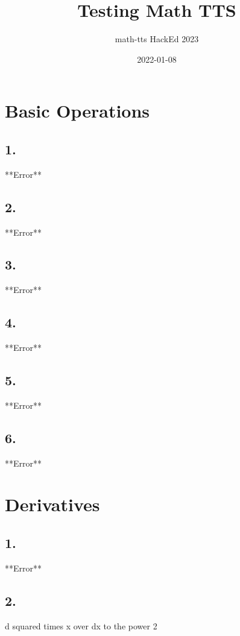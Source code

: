 \title{Testing Math TTS}
\author{math-tts HackEd 2023}
\date{2022-01-08}



\maketitle

\section*{Basic Operations}

\subsection*{1.}
**Error**

\subsection*{2.}
**Error**

\subsection*{3.}
**Error**

\subsection*{4.}
**Error**

\subsection*{5.}
**Error**

\subsection*{6.}
**Error**

\section*{Derivatives}

\subsection*{1.}
**Error**

\subsection*{2.}
d squared times x over dx to the power 2

